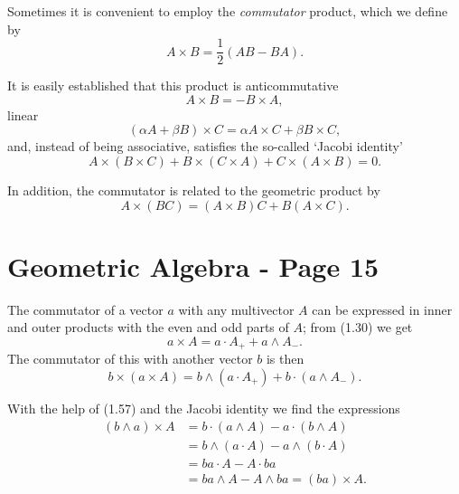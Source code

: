 \documentclass[fleqn]{scrartcl}
\numberwithin{equation}{section}
\begin{document}
\vspace{1em}
\noindent Sometimes it is convenient to employ the \textit{commutator} product, which we define by
\begin{equation}
A \times B = \frac{1}{2}(AB - BA). \tag{1.55}
\end{equation}

\noindent It is easily established that this product is anticommutative
\begin{equation}
A \times B = -B \times A, \tag{1.56a}
\end{equation}
linear
\begin{equation}
(\alpha A + \beta B) \times C = \alpha A \times C + \beta B \times C, \tag{1.56b}
\end{equation}
and, instead of being associative, satisfies the so-called `Jacobi identity'
\begin{equation}
A \times (B \times C) + B \times (C \times A) + C \times (A \times B) = 0. \tag{1.56c}
\end{equation}

\noindent In addition, the commutator is related to the geometric product by
\begin{equation}
A \times (BC) = (A \times B)C + B(A \times C). \tag{1.57}
\end{equation}

\section*{Geometric Algebra - Page 15}

\noindent The commutator of a vector \(a\) with any multivector \(A\) can be expressed in inner and outer products with the even and odd parts of \(A\); from (1.30) we get
\begin{equation}
a \times A = a \cdot A_+ + a \wedge A_-. \tag{1.58}
\end{equation}
The commutator of this with another vector \(b\) is then
\begin{equation}
b \times (a \times A) = b \wedge (a \cdot A_+) + b \cdot (a \wedge A_-). \tag{1.59}
\end{equation}

\noindent With the help of (1.57) and the Jacobi identity we find the expressions
\begin{align}
(b \wedge a) \times A &= b \cdot (a \wedge A) - a \cdot (b \wedge A) \tag{1.60a} \\
&= b \wedge (a \cdot A) - a \wedge (b \cdot A) \tag{1.60b} \\
&= ba \cdot A - A \cdot ba \tag{1.60c} \\
&= ba \wedge A - A \wedge ba = (ba) \times A. \tag{1.60d}
\end{align}
\end{document}
